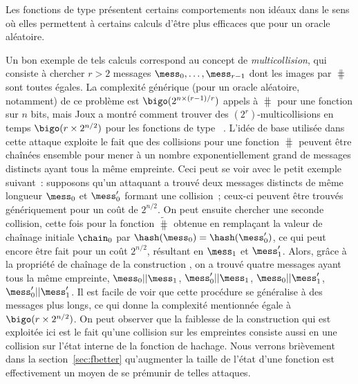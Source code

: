 Les fonctions de type \merkdam présentent certains comportements non idéaux dans le sens où elles permettent à certains calculs
d'être plus efficaces que pour un oracle aléatoire.

Un bon exemple de tels calculs correspond au concept de 
\emph{multicollision}, qui consiste à chercher $r > 2$ messages $\mess_{0},\ldots,\mess_{r-1}$ dont les images par $\hash$
sont toutes égales.
La complexité générique (pour un oracle aléatoire, notamment) de ce problème est
$\bigo(2^{n\times (r-1)/r})$ appels à $\hash$ pour une fonction sur $n$ bits, mais
Joux a montré comment trouver
des $(2^r)$-multicollisions en temps $\bigo(r\times 2^{n/2})$ pour les fonctions de type \merkdam~\cite{DBLP:conf/crypto/Joux04}.
L'idée de base utilisée dans cette attaque exploite le fait que des collisions pour une fonction \merkdam $\hash$ peuvent être chaînées
ensemble pour mener à un nombre exponentiellement grand de messages distincts ayant tous la même empreinte.
Ceci peut se voir avec le petit exemple suivant~: supposons qu'un attaquant a trouvé deux messages distincts
de même longueur $\mess_0$ et $\mess'_0$ formant une collision~; ceux-ci peuvent être trouvés génériquement
pour un coût de
$2^{n/2}$. On peut ensuite chercher une seconde collision, cette fois pour la fonction $\widetilde \hash$ obtenue en remplaçant la valeur de chaînage initiale
$\chain_0$ par $\hash(\mess_0) = \hash(\mess'_0)$, ce qui peut encore être fait pour un coût $2^{n/2}$, résultant en $\mess_1$ et $\mess'_1$.
Alors, grâce à la propriété de chaînage de la construction \merkdam, on a trouvé quatre messages ayant tous la même empreinte,
$\mess_0||\mess_1$, $\mess'_0||\mess_1$, $\mess_0||\mess'_1$, $\mess'_0||\mess'_1$. 
Il est facile de voir que cette procédure se généralise à des messages plus longs, ce qui donne la complexité mentionnée égale à
$\bigo(r \times 2^{n/2})$.
On peut observer que la faiblesse de la construction qui est exploitée ici est le fait qu'une collision
sur les empreintes consiste aussi en une collision sur l'état interne de la fonction de hachage.
Nous verrons brièvement dans la section~\ref{sec:fbetter} qu'augmenter la taille de l'état d'une fonction
est effectivement un moyen de se prémunir de telles attaques.

